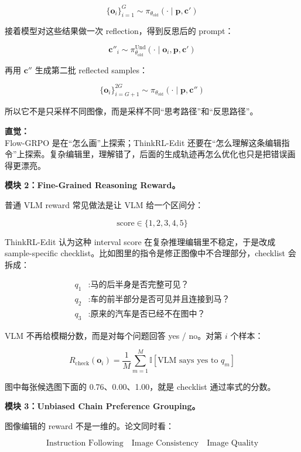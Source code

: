 \[
\{\mathbf{o}_i\}_{i=1}^{G}
\sim
\pi_{\theta_\text{old}}
(\cdot\mid \mathbf{p},\mathbf{c}')
\]

接着模型对这些结果做一次 reflection，得到反思后的 prompt：

\[
\mathbf{c}''_i
\sim
\pi_{\theta_\text{old}}^\text{Und}
(\cdot\mid \mathbf{o}_i,\mathbf{p},\mathbf{c}')
\]

再用 $\mathbf{c}''$ 生成第二批 reflected samples：

\[
\{\mathbf{o}_i\}_{i=G+1}^{2G}
\sim
\pi_{\theta_\text{old}}
(\cdot\mid \mathbf{p},\mathbf{c}'')
\]

所以它不是只采样不同图像，而是采样不同“思考路径”和“反思路径”。

\begin{intubox}
\textbf{直觉：}\\
Flow-GRPO 是在“怎么画”上探索；ThinkRL-Edit 还要在“怎么理解这条编辑指令”上探索。复杂编辑里，理解错了，后面的生成轨迹再怎么优化也只是把错误画得更漂亮。
\end{intubox}

\textbf{模块 2：Fine-Grained Reasoning Reward。}

普通 VLM reward 常见做法是让 VLM 给一个区间分：

\[
\text{score}
\in
\{1,2,3,4,5\}
\]

ThinkRL-Edit 认为这种 interval score 在复杂推理编辑里不稳定，于是改成 sample-specific checklist。比如图里的指令是修正图像中不合理部分，checklist 会拆成：

\[
\begin{aligned}
q_1 &: \text{马的后半身是否完整可见？}\\
q_2 &: \text{车的前半部分是否可见并且连接到马？}\\
q_3 &: \text{原来的汽车是否已经不在图中？}
\end{aligned}
\]

VLM 不再给模糊分数，而是对每个问题回答 yes / no。对第 $i$ 个样本：

\[
R_\text{check}(\mathbf{o}_i)
=
\frac{1}{M}
\sum_{m=1}^{M}
\mathbb{I}
\left[
\text{VLM says yes to } q_m
\right]
\]

图中每张候选图下面的 0.76、0.00、1.00，就是 checklist 通过率式的分数。

\textbf{模块 3：Unbiased Chain Preference Grouping。}

图像编辑的 reward 不是一维的。论文同时看：

\[
\text{Instruction Following}
\quad
\text{Image Consistency}
\quad
\text{Image Quality}
\]

